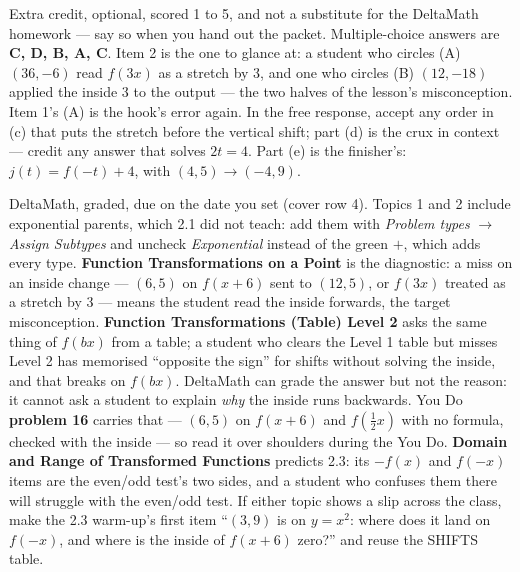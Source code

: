 \documentclass[10pt]{article}
\begin{document}
\begin{teachernote}[AP Practice]
Extra credit, optional, scored 1 to 5, and not a substitute for the DeltaMath homework --- say so when you
hand out the packet. Multiple-choice answers are \textbf{C, D, B, A, C}. Item 2 is the one to glance at: a
student who circles (A) $(36, -6)$ read $f(3x)$ as a stretch by 3, and one who circles (B)
$(12, -18)$ applied the inside 3 to the output --- the two halves of the lesson's
misconception. Item 1's (A) is the hook's error again. In the free response, accept any order
in (c) that puts the stretch before the vertical shift; part (d) is the crux in context ---
credit any answer that solves $2t = 4$. Part (e) is the finisher's: $j(t) = f(-t) + 4$, with
$(4, 5) \to (-4, 9)$.
\end{teachernote}

\begin{teachernote}[Homework]
DeltaMath, graded, due on the date you set (cover row 4). Topics 1 and 2 include exponential
parents, which 2.1 did not teach: add them with \textit{Problem types} $\to$ \textit{Assign
Subtypes} and uncheck \textit{Exponential} instead of the green $+$, which adds every type.
\textbf{Function Transformations on a Point} is the diagnostic: a miss on an inside change ---
$(6, 5)$ on $f(x + 6)$ sent to $(12, 5)$, or $f(3x)$ treated as a stretch by 3 --- means the
student read the inside forwards, the target misconception. \textbf{Function Transformations
(Table) Level 2} asks the same thing of $f(bx)$ from a table; a student who clears the
Level 1 table but misses Level 2 has memorised ``opposite the sign'' for shifts without
solving the inside, and that breaks on $f(bx)$. DeltaMath can grade the answer but not the reason: it cannot ask a student to explain
\emph{why} the inside runs backwards. You Do \textbf{problem 16} carries that --- $(6, 5)$ on
$f(x + 6)$ and $f(\tfrac{1}{2}x)$ with no formula, checked with the inside --- so read it over
shoulders during the You Do. \textbf{Domain and Range of Transformed Functions} predicts 2.3:
its $-f(x)$ and $f(-x)$ items are the even/odd test's two sides, and a student who confuses
them there will struggle with the even/odd test. If either topic shows
a slip across the class, make the 2.3 warm-up's first item ``$(3, 9)$ is on $y = x^2$: where
does it land on $f(-x)$, and where is the inside of $f(x + 6)$ zero?'' and reuse the SHIFTS
table.
\end{teachernote}
\end{document}
